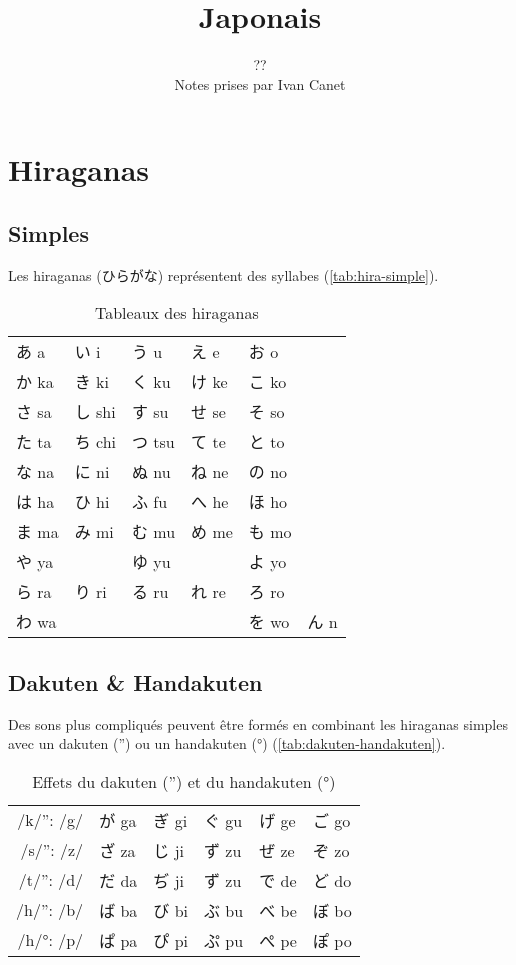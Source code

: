 \documentclass[a4paper,10pt,french,openany]{memoir}
\title{Japonais}
\author{??\\Notes prises par Ivan Canet}%
\begin{document}
\maketitle
\tableofcontents

\chapter{Hiraganas}
\section{Simples}

Les hiraganas (ひらがな) représentent des syllabes (\autoref{tab:hira-simple}).

\begin{table}[htbp]
 \centering
 \begin{tabular}{llllll}
  あ a  & い i  & う u  & え e  & お o  &\\
  か ka & き ki & く ku & け ke & こ ko &\\
  さ sa & し shi& す su & せ se & そ so &\\
  た ta & ち chi& つ tsu& て te & と to &\\
  な na & に ni & ぬ nu & ね ne & の no &\\
  は ha & ひ hi & ふ fu & へ he & ほ ho &\\
  ま ma & み mi & む mu & め me & も mo &\\
  や ya & 　    & ゆ yu &　     & よ yo &\\
  ら ra & り ri & る ru & れ re & ろ ro &\\
  わ wa & 　    & 　    & 　    & を wo & ん n\\
 \end{tabular}
 \caption{Tableaux des hiraganas}
 \label{tab:hira-simple}
\end{table}

\section{Dakuten \& Handakuten}

Des sons plus compliqués peuvent être formés en combinant les hiraganas simples avec un dakuten ('') ou un handakuten (°) (\autoref{tab:dakuten-handakuten}).

\begin{table}[htbp]
 \centering
 \begin{tabular}{r|lllll}
  /k/'': /g/ & が ga & ぎ gi & ぐ gu & げ ge & ご go \\
  /s/'': /z/ & ざ za & じ ji & ず zu & ぜ ze & ぞ zo \\
  /t/'': /d/ & だ da & ぢ ji & ず zu & で de & ど do \\
  /h/'': /b/ & ば ba & び bi & ぶ bu & べ be & ぼ bo \\
  /h/°: /p/  & ぱ pa & ぴ pi & ぷ pu & ぺ pe & ぽ po \\
 \end{tabular}
 \caption{Effets du dakuten ('') et du handakuten (°)}
 \label{tab:dakuten-handakuten}
\end{table}
\end{document}
